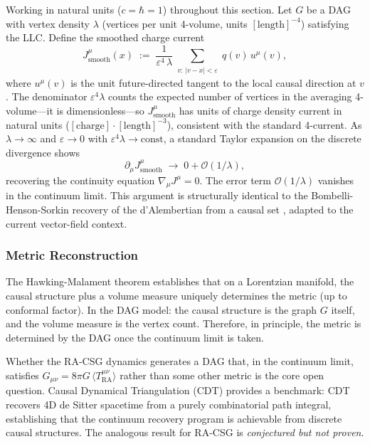 \documentclass[11pt,a4paper]{article}
\theoremstyle{plain}
\theoremstyle{definition}
\theoremstyle{remark}
\newcommand{\Tact}{T^{\mu\nu}_{\mathrm{RA}}}
\begin{document}
Working in natural units ($c = \hbar = 1$) throughout this section.
Let $G$ be a DAG with vertex density $\lambda$ (vertices per unit 4-volume, units
$[\text{length}]^{-4}$) satisfying the LLC. Define the smoothed charge current
\begin{equation}
  J^{\mu}_{\mathrm{smooth}}(x)
  \;:=\;
  \frac{1}{\varepsilon^{4}\,\lambda}
  \sum_{\substack{v:\,|v-x|<\varepsilon}} q(v)\,u^{\mu}(v),
\end{equation}
where $u^{\mu}(v)$ is the unit future-directed tangent to the local causal
direction at $v$. The denominator $\varepsilon^{4}\lambda$ counts the expected
number of vertices in the averaging 4-volume---it is dimensionless---so
$J^{\mu}_{\mathrm{smooth}}$ has units of charge density current in natural units
($[\text{charge}]\cdot[\text{length}]^{-3}$), consistent with the standard
4-current. As $\lambda \to \infty$ and $\varepsilon \to 0$ with
$\varepsilon^{4}\lambda \to \mathrm{const}$, a standard Taylor expansion on the
discrete divergence shows
\begin{equation}
  \partial_{\mu}J^{\mu}_{\mathrm{smooth}} \;\to\; 0 + \mathcal{O}(1/\lambda),
\end{equation}
recovering the continuity equation $\nabla_{\mu}J^{\mu} = 0$. The error term
$\mathcal{O}(1/\lambda)$ vanishes in the continuum limit. This argument is
structurally identical to the Bombelli-Henson-Sorkin recovery of the d'Alembertian
from a causal set \citep{Bombelli2009}, adapted to the current vector-field context.

\subsubsection{Metric Reconstruction}

The Hawking-Malament theorem establishes that on a Lorentzian manifold, the causal
structure plus a volume measure uniquely determines the metric (up to conformal
factor). In the DAG model: the causal structure is the graph $G$ itself, and the
volume measure is the vertex count. Therefore, in principle, the metric is
determined by the DAG once the continuum limit is taken.

Whether the RA-CSG dynamics generates a DAG that, in the continuum limit, satisfies
$G_{\mu\nu} = 8\pi G\,\langle\Tact\rangle$ rather than some other metric is the
core open question. Causal Dynamical Triangulation (CDT) \citep{Ambjorn2012}
provides a benchmark: CDT recovers 4D de Sitter spacetime from a purely
combinatorial path integral, establishing that the continuum recovery program is
achievable from discrete causal structures. The analogous result for RA-CSG is
\emph{conjectured but not proven}.
\end{document}
